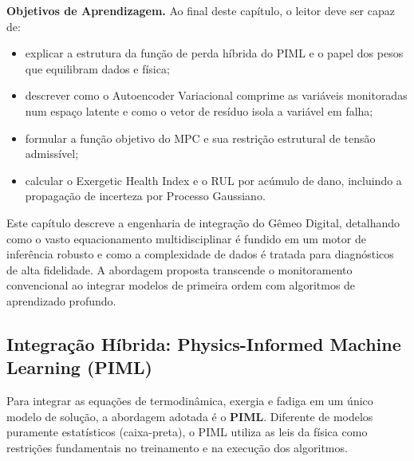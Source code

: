 \documentclass[12pt,a4paper]{article}
\numberwithin{equation}{section}
\numberwithin{table}{section}
\numberwithin{figure}{section}
\begin{document}
\textbf{Objetivos de Aprendizagem.} Ao final deste capítulo, o leitor deve ser
capaz de:
\begin{itemize}
	\item explicar a estrutura da função de perda híbrida do PIML e o papel
	dos pesos que equilibram dados e física;
	\item descrever como o Autoencoder Variacional comprime as variáveis
	monitoradas num espaço latente e como o vetor de resíduo isola a
	variável em falha;
	\item formular a função objetivo do MPC e sua restrição estrutural de
	tensão admissível;
	\item calcular o Exergetic Health Index e o RUL por acúmulo de dano,
	incluindo a propagação de incerteza por Processo Gaussiano.
\end{itemize}

Este capítulo descreve a engenharia de integração do Gêmeo Digital, detalhando como o vasto equacionamento multidisciplinar é fundido em um motor de inferência robusto e como a complexidade de dados é tratada para diagnósticos de alta fidelidade. A abordagem proposta transcende o monitoramento convencional ao integrar modelos de primeira ordem com algoritmos de aprendizado profundo.

\subsection{Integração Híbrida: Physics-Informed Machine Learning (PIML)}

Para integrar as equações de termodinâmica, exergia e fadiga em um único modelo de solução, a abordagem adotada é o \textbf{PIML}. Diferente de modelos puramente estatísticos (caixa-preta), o PIML utiliza as leis da física como restrições fundamentais no treinamento e na execução dos algoritmos.
\end{document}
